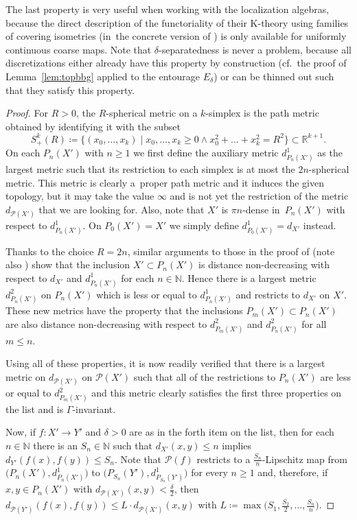 \documentclass[pdftex]{sigma}
\numberwithin{equation}{section}
\theoremstyle{definition}
\newcommand{\N}{\mathbb{N}}
\newcommand{\R}{\mathbb{R}}
\newcommand{\cP}{\mathcal{P}}
\newcommand{\K}{\mathrm{K}}
\begin{document}
The last property is very useful when working with the localization algebras, because the direct description of the functoriality of their $\K$-theory using families of covering isometries (in~the concrete version of \cite[Definition 4.29 and~Proposition 4.30]{EngelWulffZeidler}) is only available for uniformly continuous coarse maps.
Note that $\delta$-separatedness is never a problem, because all discretizations either already have this property by construction (cf.\ the proof of Lemma~\ref{lem:topbbg} applied to the entourage $E_\delta$) or can be thinned out such that they satisfy this property.
\begin{proof}
For $R>0$, the $R$-spherical metric on a $k$-simplex is the path metric obtained by identifying it with the subset
\[
S^k_+(R)\coloneqq\big\{(x_0,\dots,x_k)\mid x_0,\dots,x_k\geq 0 \wedge x_0^2+\dots+x_k^2=R^2\big\}\subset\R^{k+1}.
\]
On each $P_n(X')$ with $n\geq 1$ we first define the auxiliary metric $d^1_{P_n(X')}$ as the largest metric such that its restriction to each simplex is at most the $2n$-spherical metric.
This metric is clearly a~proper path metric and it induces the given topology, but it may take the value $\infty$ and is not yet the restriction of the metric $d_{\cP(X')}$ that we are looking for. Also, note that $X'$ is $\pi n$-dense in~$P_n(X')$ with respect to $d^1_{P_n(X')}$.
On $P_0(X')=X'$ we simply define $d^1_{P_0(X')}=d_{X'}$ instead.

Thanks to the choice $R=2n$, similar arguments to those in the proof of \cite[Proposition~3.4(iv)]{Roe_Hyperbolic} (note also \cite{Roe_Hyperbolic_Erratum}) show that the inclusion $X'\subset P_n(X')$ is distance non-decreasing with respect to $d_{X'}$ and $d^1_{P_n(X')}$ for each $n\in\N$. Hence there is a largest metric $d^2_{P_n(X')}$ on $P_n(X')$ which is less or equal to $d^1_{P_n(X')}$ and restricts to $d_{X'}$ on $X'$. These new metrics have the property that the inclusions $P_m(X')\subset P_n(X')$ are also distance non-decreasing with respect to $d^2_{P_m(X')}$ and $d^2_{P_n(X')}$ for all $m\leq n$.

Using all of these properties, it is now readily verified that there is a largest metric on $d_{\cP(X')}$ on $\cP(X')$ such that all of the restrictions to $P_n(X')$ are less or equal to $d^2_{P_m(X')}$ and this metric clearly satisfies the first three properties on the list and is $\Gamma$-invariant.

Now, if $f\colon X'\to Y'$ and $\delta>0$ are as in the forth item on the list, then for each $n\in\N$ there is an $S_n\in\N$ such that $d_{X'}(x,y)\leq n$ implies $d_{Y'}(f(x),f(y))\leq S_n$. Note that $\cP(f)$ restricts to a $\frac{S_n}{n}$-Lipschitz map from $\big(P_n(X'),d^1_{P_n(X')}\big)$ to $\big(P_{S_n}(Y'),d^1_{P_{S_n}(Y')}\big)$ for every $n\geq 1$ and, therefore, if $x,y\in P_n(X')$ with $d_{\cP(X')}(x,y)<\frac{\delta}{2}$, then $d_{\cP(Y')}(f(x),f(y))\leq L\cdot d_{\cP(X')}(x,y)$ with $L\coloneqq\max\bigl(S_1,\frac{S_2}{2},\dots,\frac{S_n}{n}\bigr)$.
\end{proof}
\end{document}
